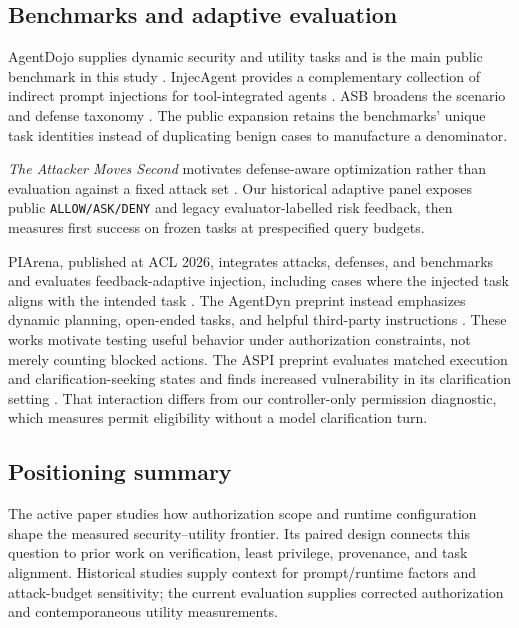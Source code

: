 \subsection{Benchmarks and adaptive evaluation}

\label{sec:related-work-benchmarks-and-adaptive-evaluation}

AgentDojo supplies dynamic security and utility tasks and is the main public benchmark in this study \citep{L09}. InjecAgent provides a complementary collection of indirect prompt injections for tool-integrated agents \citep{L10}. ASB broadens the scenario and defense taxonomy \citep{L34}. The public expansion retains the benchmarks' unique task identities instead of duplicating benign cases to manufacture a denominator.

\textit{The Attacker Moves Second} motivates defense-aware optimization rather than evaluation against a fixed attack set \citep{L27}. Our historical adaptive panel exposes public \nolinkurl{ALLOW/ASK/DENY} and legacy evaluator-labelled risk feedback, then measures first success on frozen tasks at prespecified query budgets.

PIArena, published at ACL 2026, integrates attacks, defenses, and benchmarks and evaluates feedback-adaptive injection, including cases where the injected task aligns with the intended task \citep{L37}. The AgentDyn preprint instead emphasizes dynamic planning, open-ended tasks, and helpful third-party instructions \citep{L38}. These works motivate testing useful behavior under authorization constraints, not merely counting blocked actions. The ASPI preprint evaluates matched execution and clarification-seeking states and finds increased vulnerability in its clarification setting \citep{L39}. That interaction differs from our controller-only permission diagnostic, which measures permit eligibility without a model clarification turn.

\subsection{Positioning summary}

\label{sec:related-work-positioning-summary}

The active paper studies how authorization scope and runtime configuration shape the measured security--utility frontier. Its paired design connects this question to prior work on verification, least privilege, provenance, and task alignment. Historical studies supply context for prompt/runtime factors and attack-budget sensitivity; the current evaluation supplies corrected authorization and contemporaneous utility measurements.
